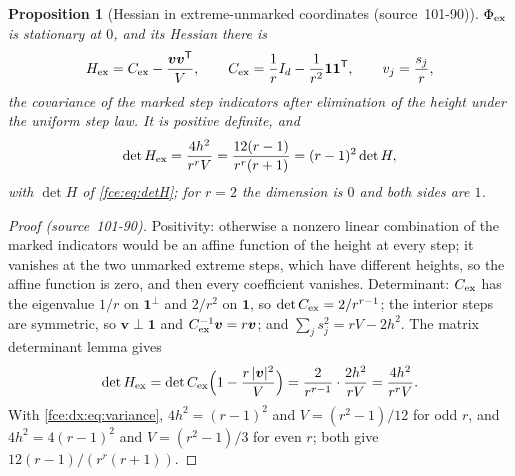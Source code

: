 \documentclass[11pt,a4paper]{article}
\numberwithin{equation}{section}
\newtheorem{proposition}[theorem]{Proposition}
\theoremstyle{definition}\newtheorem{definition}[theorem]{Definition}
\theoremstyle{remark}\newtheorem{remark}[theorem]{Remark}
\newcommand{\one}{\boldsymbol 1}
\begin{document}
\begin{proposition}[Hessian in extreme-unmarked coordinates (source~101-90)]\label{fce:dx:prop:det}
$\Phi_{\rm ex}$ is stationary at $0$, and its Hessian there is
\begin{equation}\label{fce:dx:eq:Hex}
 H_{\rm ex}=C_{\rm ex}-\frac{\boldsymbol v\boldsymbol v^{\mathsf T}}{V},\qquad
 C_{\rm ex}=\frac1rI_d-\frac1{r^2}\one\one^{\mathsf T},\qquad
 v_j=\frac{s_j}r ,
\end{equation}
the covariance of the marked step indicators after elimination of the height
under the uniform step law. It is positive definite, and
\begin{equation}\label{fce:dx:eq:detex}
 \det H_{\rm ex}=\frac{4h^2}{r^rV}=\frac{12(r-1)}{r^r(r+1)}
 =(r-1)^2\det H,
\end{equation}
with $\det H$ of \eqref{fce:eq:detH}; for $r=2$ the dimension is $0$ and both
sides are $1$.
\end{proposition}
\begin{proof}[Proof (source~101-90)]
Positivity: otherwise a nonzero linear combination of the marked indicators
would be an affine function of the height at every step; it vanishes at the
two unmarked extreme steps, which have different heights, so the affine
function is zero, and then every coefficient vanishes. Determinant:
$C_{\rm ex}$ has the eigenvalue $1/r$ on $\one^\perp$ and $2/r^2$ on $\one$, so
$\det C_{\rm ex}=2/r^{r-1}$; the interior steps are symmetric, so
$\boldsymbol v\perp\one$ and $C_{\rm ex}^{-1}\boldsymbol v=r\boldsymbol v$; and
$\sum_js_j^2=rV-2h^2$. The matrix determinant lemma gives
\[
 \det H_{\rm ex}=\det C_{\rm ex}\Bigl(1-\frac{r\,|\boldsymbol v|^2}{V}\Bigr)
 =\frac2{r^{r-1}}\cdot\frac{2h^2}{rV}=\frac{4h^2}{r^rV}.
\]
With \eqref{fce:dx:eq:variance}, $4h^2=(r-1)^2$ and $V=(r^2-1)/12$ for odd
$r$, and $4h^2=4(r-1)^2$ and $V=(r^2-1)/3$ for even $r$; both give
$12(r-1)/(r^r(r+1))$.
\end{proof}
\end{document}
